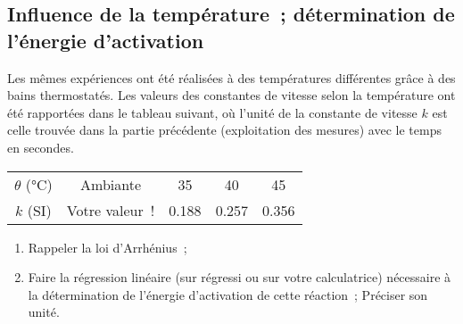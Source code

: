 \documentclass[a4paper, 11pt, final, garamond]{book}
\begin{document}
\subsection{Influence de la température~; détermination de l'énergie d'activation}

Les mêmes expériences ont été réalisées à des températures différentes grâce
à des bains thermostatés. Les valeurs des constantes de vitesse selon la
température ont été rapportées dans le tableau suivant, où l'unité de la
constante de vitesse $k$ est celle trouvée dans la partie précédente
(exploitation des mesures) avec le temps en secondes.

\begin{center}
    \begin{tabular}{ccccc}
        \toprule 
        $\theta$ (\si{\degreeCelsius}) &
        Ambiante & 35 & 40 & 45 \\
        $k$ (\si{SI}) &
        Votre valeur~! & \num{0.188} & \num{0.257} & \num{0.356}\\
        \bottomrule
    \end{tabular}
\end{center}

\begin{enumerate}[label=\sqenumi, start= 22]
    \item Rappeler la loi d'Arrhénius~; 
    \item Faire la régression linéaire (sur régressi ou sur votre calculatrice)
        nécessaire à la détermination de l'énergie d'activation de cette
        réaction~; Préciser son unité. 
\end{enumerate}

% 
% 
\end{document}
